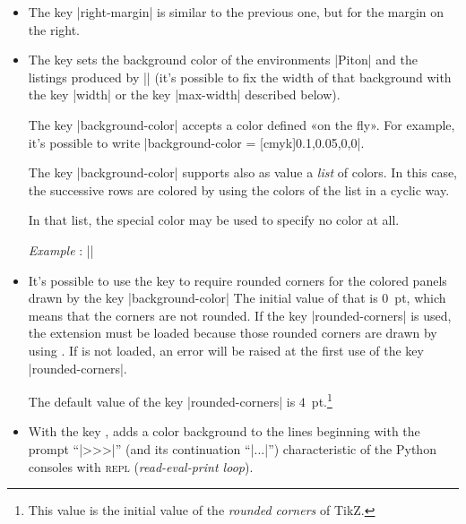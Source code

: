 \documentclass{article}
\begin{document}
\begin{itemize}
It's possible to use the key |left-margin| with the special value |auto|. With that
value, if the key |line-numbers| is in force, a margin will be automatically
inserted to fit the numbers of lines. See an example part
\ref{example-numbering} on page~\pageref{example-numbering}.


\item {}
The key |right-margin| is similar to the previous one, but for the margin on the
right.

\item {} \label{background-color} The key
 sets the background color of the environments
|{Piton}| and the listings produced by |\PitonInputFile| (it's possible to fix
the width of that background with the key |width| or the key |max-width|
described below).

The key |background-color| accepts a color
defined «on the fly». For example, it's possible to write
|background-color = [cmyk]{0.1,0.05,0,0}|.

\smallskip
The key |background-color| supports also as value a \emph{list} of colors. In
this case, the successive rows are colored by using the colors of the list in
a cyclic way.

\smallskip
In that list, the special color  may be used to specify no
color at all.

\emph{Example} : ||

\item {} 
It's possible to use the key  to require rounded
corners for the colored panels drawn by the key |background-color| The initial
value of that is $0$~pt, which means that the corners are not rounded. If the
key |rounded-corners| is used, the extension  must be loaded because
those rounded corners are drawn by using . If  is not
loaded, an error will be raised at the first use of the key |rounded-corners|.

The default value of the key |rounded-corners| is $4$~pt.\footnote{This value is the
initial value of the \emph{rounded corners} of TikZ.}

\item {} With the key
,  adds a 
color background to the lines beginning with the prompt ``|>>>|'' (and its
continuation ``|...|'') characteristic of the Python consoles with
\textsc{repl} (\emph{read-eval-print loop}).


\end{itemize}
\end{document}
